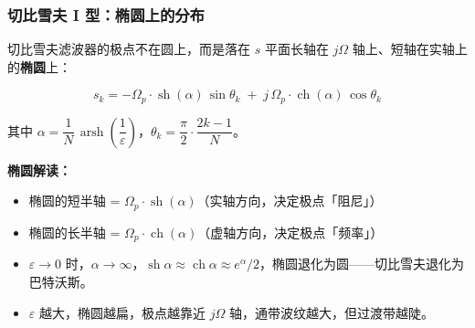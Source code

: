 \documentclass[12pt,a4paper]{ctexart}
\newcommand{\Omegap}{\Omega_p}
\newcommand{\ch}{\operatorname{ch}}
\DeclareMathOperator{\sh}{sh}
\DeclareMathOperator{\arsh}{arsh}
\begin{document}
\subsubsection*{切比雪夫 I 型：椭圆上的分布}

切比雪夫滤波器的极点不在圆上，而是落在 $s$ 平面长轴在 $j\Omega$ 轴上、短轴在实轴上的\textbf{椭圆}上：

$$
s_k = -\Omegap \cdot \sh(\alpha)\,\sin\theta_k \;+\; j\,\Omegap \cdot \ch(\alpha)\,\cos\theta_k
$$

其中 $\alpha = \dfrac{1}{N}\,\arsh\!\left(\dfrac{1}{\varepsilon}\right)$，$\theta_k = \dfrac{\pi}{2}\cdot\dfrac{2k-1}{N}$。

\begin{insight}
\textbf{椭圆解读：}
\begin{itemize}
    \item 椭圆的短半轴 = $\Omegap \cdot \sh(\alpha)$（实轴方向，决定极点「阻尼」）
    \item 椭圆的长半轴 = $\Omegap \cdot \ch(\alpha)$（虚轴方向，决定极点「频率」）
    \item $\varepsilon \to 0$ 时，$\alpha \to \infty$，$\sh\alpha \approx \ch\alpha \approx e^\alpha/2$，椭圆退化为圆——切比雪夫退化为巴特沃斯。
    \item $\varepsilon$ 越大，椭圆越扁，极点越靠近 $j\Omega$ 轴，通带波纹越大，但过渡带越陡。
\end{itemize}
\end{insight}
\end{document}
